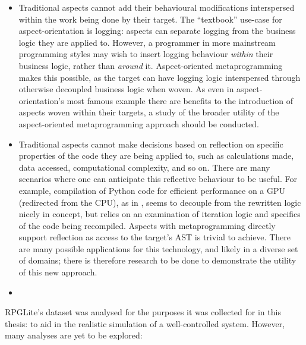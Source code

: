 \begin{itemize}
    \item Traditional aspects cannot add their behavioural modifications
    interspersed within the work being done by their target. The ``textbook''
    use-case for aspect-orientation is logging: aspects can separate logging
    from the business logic they are applied to. However, a programmer in more
    mainstream programming styles may wish to insert logging behaviour
    \emph{within} their business logic, rather than \emph{around} it.
    Aspect-oriented metaprogramming makes this possible, as the target can have
    logging logic interspersed through otherwise decoupled business logic when
    woven. As even in aspect-orientation's most famous example there are
    benefits to the introduction of aspects woven within their targets, a study
    of the broader utility of the aspect-oriented metaprogramming approach
    should be conducted.
    \item Traditional aspects cannot make decisions based on reflection on
    specific properties of the code they are being applied to, such as
    calculations made, data accessed, computational complexity, and so on. There
    are many scenarios where one can anticipate this reflective behaviour to be
    useful. For example, compilation of Python code for efficient performance on
    a GPU (redirected from the CPU), as in , seems to decouple from the rewritten logic
    nicely in concept, but relies on an examination of iteration logic and
    specifics of the code being recompiled. Aspects with metaprogramming
    directly support reflection as access to the target's AST is trivial to
    achieve. There are many possible applications for this technology, and
    likely in a diverse set of domains; there is therefore research to be done
    to demonstrate the utility of this new approach.
    \item {}
\end{itemize}



RPGLite's dataset was analysed for the purposes it was collected for in this
thesis: to aid in the realistic simulation of a well-controlled \sociotechnical
system. However, many analyses are yet to be explored:

